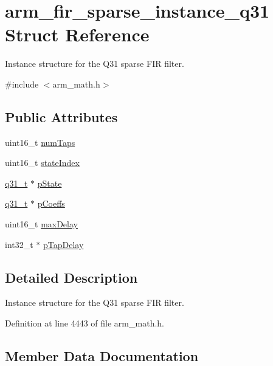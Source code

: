 \hypertarget{structarm__fir__sparse__instance__q31}{}\section{arm\+\_\+fir\+\_\+sparse\+\_\+instance\+\_\+q31 Struct Reference}
\label{structarm__fir__sparse__instance__q31}


Instance structure for the Q31 sparse F\+IR filter.  




{\ttfamily \#include $<$arm\+\_\+math.\+h$>$}

\subsection*{Public Attributes}
\begin{DoxyCompactItemize}
\item 
uint16\+\_\+t \hyperlink{structarm__fir__sparse__instance__q31_a07b6c01e58ec6dde384719130d36b0dc}{num\+Taps}
\item 
uint16\+\_\+t \hyperlink{structarm__fir__sparse__instance__q31_a557ed9d477e76e4ad2019344f19f568a}{state\+Index}
\item 
\hyperlink{arm__math_8h_adc89a3547f5324b7b3b95adec3806bc0}{q31\+\_\+t} $\ast$ \hyperlink{structarm__fir__sparse__instance__q31_a830be89daa5a393b225048889aa045d1}{p\+State}
\item 
\hyperlink{arm__math_8h_adc89a3547f5324b7b3b95adec3806bc0}{q31\+\_\+t} $\ast$ \hyperlink{structarm__fir__sparse__instance__q31_a093d6227f0d1597982cd083fb126f4e0}{p\+Coeffs}
\item 
uint16\+\_\+t \hyperlink{structarm__fir__sparse__instance__q31_afdd3a1dc72132c854dc379154b68b674}{max\+Delay}
\item 
int32\+\_\+t $\ast$ \hyperlink{structarm__fir__sparse__instance__q31_ab87ae457adec8f727afefaa2599fc983}{p\+Tap\+Delay}
\end{DoxyCompactItemize}


\subsection{Detailed Description}
Instance structure for the Q31 sparse F\+IR filter. 

Definition at line 4443 of file arm\+\_\+math.\+h.



\subsection{Member Data Documentation}
\mbox{\label{structarm__fir__sparse__instance__q31_afdd3a1dc72132c854dc379154b68b674}} 
